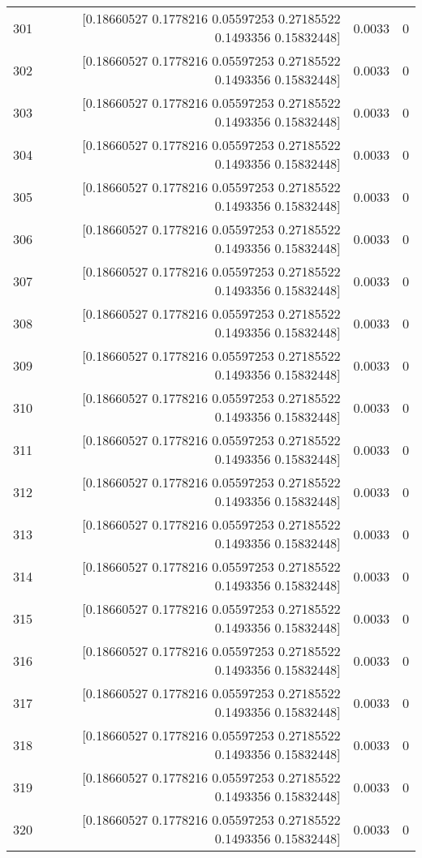 \begin{longtable}{lrrr}
301 & [0.18660527 0.1778216  0.05597253 0.27185522 0.1493356  0.15832448] & 0.0033 & 0 \\
302 & [0.18660527 0.1778216  0.05597253 0.27185522 0.1493356  0.15832448] & 0.0033 & 0 \\
303 & [0.18660527 0.1778216  0.05597253 0.27185522 0.1493356  0.15832448] & 0.0033 & 0 \\
304 & [0.18660527 0.1778216  0.05597253 0.27185522 0.1493356  0.15832448] & 0.0033 & 0 \\
305 & [0.18660527 0.1778216  0.05597253 0.27185522 0.1493356  0.15832448] & 0.0033 & 0 \\
306 & [0.18660527 0.1778216  0.05597253 0.27185522 0.1493356  0.15832448] & 0.0033 & 0 \\
307 & [0.18660527 0.1778216  0.05597253 0.27185522 0.1493356  0.15832448] & 0.0033 & 0 \\
308 & [0.18660527 0.1778216  0.05597253 0.27185522 0.1493356  0.15832448] & 0.0033 & 0 \\
309 & [0.18660527 0.1778216  0.05597253 0.27185522 0.1493356  0.15832448] & 0.0033 & 0 \\
310 & [0.18660527 0.1778216  0.05597253 0.27185522 0.1493356  0.15832448] & 0.0033 & 0 \\
311 & [0.18660527 0.1778216  0.05597253 0.27185522 0.1493356  0.15832448] & 0.0033 & 0 \\
312 & [0.18660527 0.1778216  0.05597253 0.27185522 0.1493356  0.15832448] & 0.0033 & 0 \\
313 & [0.18660527 0.1778216  0.05597253 0.27185522 0.1493356  0.15832448] & 0.0033 & 0 \\
314 & [0.18660527 0.1778216  0.05597253 0.27185522 0.1493356  0.15832448] & 0.0033 & 0 \\
315 & [0.18660527 0.1778216  0.05597253 0.27185522 0.1493356  0.15832448] & 0.0033 & 0 \\
316 & [0.18660527 0.1778216  0.05597253 0.27185522 0.1493356  0.15832448] & 0.0033 & 0 \\
317 & [0.18660527 0.1778216  0.05597253 0.27185522 0.1493356  0.15832448] & 0.0033 & 0 \\
318 & [0.18660527 0.1778216  0.05597253 0.27185522 0.1493356  0.15832448] & 0.0033 & 0 \\
319 & [0.18660527 0.1778216  0.05597253 0.27185522 0.1493356  0.15832448] & 0.0033 & 0 \\
320 & [0.18660527 0.1778216  0.05597253 0.27185522 0.1493356  0.15832448] & 0.0033 & 0 \\

\end{longtable}
